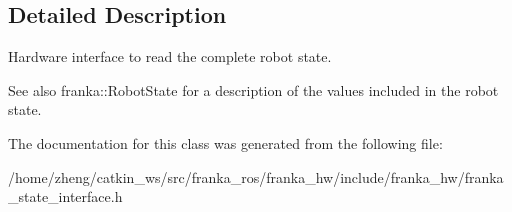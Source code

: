 \subsection{Detailed Description}
Hardware interface to read the complete robot state.

\begin{DoxySeeAlso}{See also}
franka\+::\+Robot\+State for a description of the values included in the robot state. 
\end{DoxySeeAlso}


The documentation for this class was generated from the following file\+:\begin{DoxyCompactItemize}
\item 
/home/zheng/catkin\+\_\+ws/src/franka\+\_\+ros/franka\+\_\+hw/include/franka\+\_\+hw/franka\+\_\+state\+\_\+interface.\+h\end{DoxyCompactItemize}
